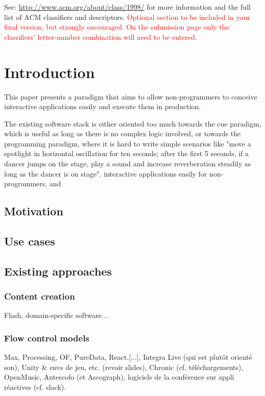 \documentclass{sigchi}
\begin{document}

See: \url{http://www.acm.org/about/class/1998/}
for more information and the full list of ACM classifiers
and descriptors. \newline
\textcolor{red}{Optional section to be included in your final version, 
but strongly encouraged. On the submission page only the classifiers’ 
letter-number combination will need to be entered.}

\section{Introduction}
This paper presents a paradigm that aims to allow non-programmers 
to conceive interactive applications easily and execute them in production.

The existing software stack is either oriented too much towards the 
cue paradigm, which is useful as long as there is no complex logic involved, 
or towards the programming paradigm, where it is hard to write simple scenarios 
like "move a spotlight in horizontal oscillation for ten seconds; after the first 5 
seconds, if a dancer jumps on the stage, play a sound and increase reverberation steadily as long as the dancer is on stage".
interactive applications easily for non-programmers, and 

\subsection{Motivation}

\subsection{Use cases}

\subsection{Existing approaches}

\subsubsection{Content creation}
Flash, domain-specific software...

\subsubsection{Flow control models}
Max, Processing, OF, PureData, React.[...], Integra Live (qui est plutôt orienté son), Unity \& envs de jeu, etc. (revoir slides), Chronic (cf. téléchargements), OpenMusic, Antescofo (et Ascograph), logiciels de la conférence sur appli réactives (cf. slack).
\end{document}

